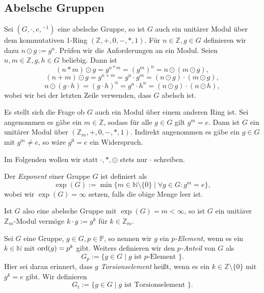 
\subsection{Abelsche Gruppen}

\begin{remark}
    Sei $(G, \cdot, e, {}^{-1})$ eine abelsche Gruppe, so ist $G$ auch ein unitärer Modul über dem kommutativen 1-Ring $(\mathbb{Z}, +, 0, -, \ast, 1)$. Für $n \in \mathbb{Z}, g \in G$ definieren wir dazu $n \odot g := g^n$. Prüfen wir die Anforderungen an ein Modul. Seien $n, m \in \mathbb{Z}, g, h \in G$ beliebig. Dann ist
    $$ (n \ast m) \odot g = g^{n \ast m} = (g^m)^n = n \odot (m \odot g), $$
    $$ (n+m) \odot g = g^{n+m} = g^n \cdot g^m = (n \odot g) \cdot (m \odot g), $$
    $$ n \odot (g \cdot h) = (g \cdot h)^n = g^n \cdot h^n = (n \odot g) \cdot (n \odot h), $$
    wobei wir bei der letzten Zeile verwenden, dass $G$ abelsch ist.

    Es stellt sich die Frage ob $G$ auch ein Modul über einem anderen Ring ist. Sei angenommen es gäbe ein $m \in \mathbb{Z}$, sodass für alle $g \in G$ gilt $g^m = e$. Dann ist $G$ ein unitärer Modul über $(\mathbb{Z}_m, +, 0, -, \ast, 1)$. Indirekt angenommen es gäbe ein $g \in G$ mit $g^m \neq e$, so wäre $g^0 = e$ ein Widerspruch.

    Im Folgenden wollen wir statt $\cdot, \ast, \odot$ stets nur $\cdot$ schreiben.
\end{remark}

\begin{definition}
    Der \emph{Exponent} einer Gruppe $G$ ist definiert als
    $$ \exp(G) := \min \{ m \in \mathbb{N} \setminus \{0\} \mid \forall g \in G: g^m = e \}, $$
    wobei wir $\exp(G) = \infty$ setzen, falls die obige Menge leer ist.
\end{definition}

\begin{remark}
    Ist $G$ also eine abelsche Gruppe mit $\exp(G) = m < \infty$, so ist $G$ ein unitärer $\mathbb{Z}_m$-Modul vermöge $k \cdot g := g^k$ für $k \in \mathbb{Z}_m$.
\end{remark}

\begin{definition}
    Sei $G$ eine Gruppe, $g \in G, p \in \mathbb{P}$, so nennen wir $g$ ein \emph{$p$-Element}, wenn es ein $k \in \mathbb{N}$ mit $\operatorname{ord}(g) = p^k$ gibt. Weiters definieren wir den \emph{$p$-Anteil} von $G$ als
    $$ G_p := \{ g \in G \mid g \textrm{ ist $p$-Element } \}. $$
    Hier sei daran erinnert, dass $g$ \emph{Torsionselement} heißt, wenn es ein $k \in \mathbb{Z} \setminus \{ 0 \}$ mit $g^k = e$ gibt. Wir definieren
    $$ G_t := \{ g \in G \mid g \textrm{ ist Torsionselement } \}. $$
\end{definition}


